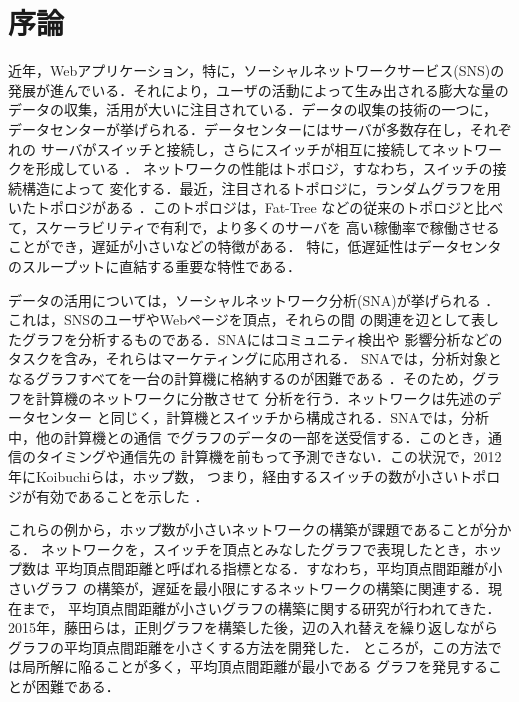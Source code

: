 
\chapter{序論}

近年，Webアプリケーション，特に，ソーシャルネットワークサービス(SNS)の
発展が進んでいる．それにより，ユーザの活動によって生み出される膨大な量の
データの収集，活用が大いに注目されている．データの収集の技術の一つに，
データセンターが挙げられる．データセンターにはサーバが多数存在し，それぞれの
サーバがスイッチと接続し，さらにスイッチが相互に接続してネットワークを形成している
\cite{Greenberg2009,Al-Fares2008}．
ネットワークの性能はトポロジ，すなわち，スイッチの接続構造によって
変化する．最近，注目されるトポロジに，ランダムグラフを用いたトポロジがある
\cite{Singla2011,Koibuchi2012}．このトポロジは，Fat-Tree\cite{Al-Fares2008}
などの従来のトポロジと比べて，スケーラビリティで有利で，より多くのサーバを
高い稼働率で稼働させることができ，遅延が小さいなどの特徴がある\cite{Singla2011}．
特に，低遅延性はデータセンタのスループットに直結する重要な特性である．

データの活用については，ソーシャルネットワーク分析(SNA)が挙げられる
\cite{Aggarwal2011}．これは，SNSのユーザやWebページを頂点，それらの間
の関連を辺として表したグラフを分析するものである．SNAにはコミュニティ検出や
影響分析などのタスクを含み，それらはマーケティングに応用される．
SNAでは，分析対象となるグラフすべてを一台の計算機に格納するのが困難である
\cite{Ching2015}．そのため，グラフを計算機のネットワークに分散させて
分析を行う\cite{Ching2015,Malewicz2010}．ネットワークは先述のデータセンター
と同じく，計算機とスイッチから構成される．SNAでは，分析中，他の計算機との通信
でグラフのデータの一部を送受信する．このとき，通信のタイミングや通信先の
計算機を前もって予測できない．この状況で，2012年にKoibuchiらは，ホップ数，
つまり，経由するスイッチの数が小さいトポロジが有効であることを示した
\cite{Koibuchi2012}．

これらの例から，ホップ数が小さいネットワークの構築が課題であることが分かる．
ネットワークを，スイッチを頂点とみなしたグラフで表現したとき，ホップ数は
平均頂点間距離と呼ばれる指標となる．すなわち，平均頂点間距離が小さいグラフ
の構築が，遅延を最小限にするネットワークの構築に関連する．現在まで，
平均頂点間距離が小さいグラフの構築に関する研究が行われてきた．
2015年，藤田らは，正則グラフを構築した後，辺の入れ替えを繰り返しながら
グラフの平均頂点間距離を小さくする方法を開発した\cite{Fujita2015}．
ところが，この方法では局所解に陥ることが多く，平均頂点間距離が最小である
グラフを発見することが困難である．

